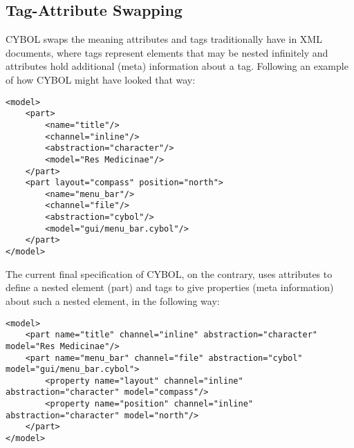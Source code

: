 %
%
%
%
%
%
%

\subsection{Tag-Attribute Swapping}
\label{tag_attribute_swapping_heading}

CYBOL swaps the meaning attributes and tags traditionally have in XML
documents, where tags represent elements that may be nested infinitely and
attributes hold additional (meta) information about a tag. Following an example
of how CYBOL might have looked that way:

\begin{scriptsize}
    \begin{verbatim}
<model>
    <part>
        <name="title"/>
        <channel="inline"/>
        <abstraction="character"/>
        <model="Res Medicinae"/>
    </part>
    <part layout="compass" position="north">
        <name="menu_bar"/>
        <channel="file"/>
        <abstraction="cybol"/>
        <model="gui/menu_bar.cybol"/>
    </part>
</model>
    \end{verbatim}
\end{scriptsize}

The current final specification of CYBOL, on the contrary, uses attributes to
define a nested element (part) and tags to give properties (meta information)
about such a nested element, in the following way:

\begin{scriptsize}
    \begin{verbatim}
<model>
    <part name="title" channel="inline" abstraction="character" model="Res Medicinae"/>
    <part name="menu_bar" channel="file" abstraction="cybol" model="gui/menu_bar.cybol">
        <property name="layout" channel="inline" abstraction="character" model="compass"/>
        <property name="position" channel="inline" abstraction="character" model="north"/>
    </part>
</model>
    \end{verbatim}
\end{scriptsize}

